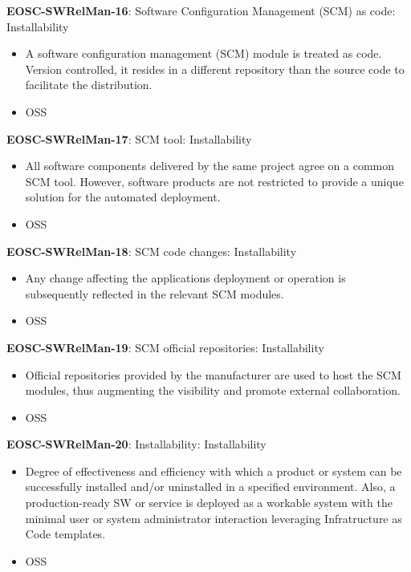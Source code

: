 \textbf{EOSC-SWRelMan-16}: Software Configuration Management (SCM) as code: Installability

\begin{itemize}
    \item A software configuration management (SCM) module is treated as code. Version controlled, it resides in a different repository than the source code to facilitate the distribution. \cite{orviz_set_2017}
    \item OSS
\end{itemize}

\textbf{EOSC-SWRelMan-17}: SCM tool: Installability

\begin{itemize}
    \item All software components delivered by the same project agree on a common SCM tool. However, software products are not restricted to provide a unique solution for the automated deployment. \cite{orviz_set_2017}
    \item OSS
\end{itemize}

\textbf{EOSC-SWRelMan-18}: SCM code changes: Installability

\begin{itemize}
    \item Any change affecting the applications deployment or operation is subsequently reflected in the relevant SCM modules. \cite{orviz_set_2017}
    \item OSS
\end{itemize}

\textbf{EOSC-SWRelMan-19}: SCM official repositories: Installability

\begin{itemize}
    \item Official repositories provided by the manufacturer are used to host the SCM modules, thus augmenting the visibility and promote external collaboration. \cite{orviz_set_2017}
    \item OSS
\end{itemize}

\textbf{EOSC-SWRelMan-20}: Installability: Installability

\begin{itemize}
    \item Degree of effectiveness and efficiency with which a product or system can be successfully installed and/or uninstalled in a specified environment. Also, a production-ready SW or service is deployed as a workable system with the minimal user or system administrator interaction leveraging Infratructure as Code templates. \cite{iso_25010_2011_2017,orviz_fernandez_eosc-synergy_2020}
    \item OSS
\end{itemize}

